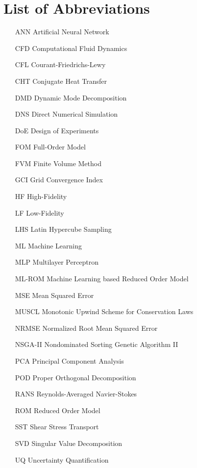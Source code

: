 \chapter*{List of Abbreviations}

\begin{itemize}
\item[ANN] Artificial Neural Network
\item[CFD] Computational Fluid Dynamics
\item[CFL] Courant-Friedrichs-Lewy
\item[CHT] Conjugate Heat Transfer
\item[DMD] Dynamic Mode Decomposition
\item[DNS] Direct Numerical Simulation
\item[DoE] Design of Experiments
\item[FOM] Full-Order Model
\item[FVM] Finite Volume Method
\item[GCI] Grid Convergence Index
\item[HF] High-Fidelity
\item[LF] Low-Fidelity
\item[LHS] Latin Hypercube Sampling
\item[ML] Machine Learning
\item[MLP] Multilayer Perceptron
\item[ML-ROM] Machine Learning based Reduced Order Model
\item[MSE] Mean Squared Error
\item[MUSCL] Monotonic Upwind Scheme for Conservation Laws
\item[NRMSE] Normalized Root Mean Squared Error
\item[NSGA-II] Nondominated Sorting Genetic Algorithm II
\item[PCA] Principal Component Analysis
\item[POD] Proper Orthogonal Decomposition
\item[RANS] Reynolds-Averaged Navier-Stokes
\item[ROM] Reduced Order Model
\item[SST] Shear Stress Transport
\item[SVD] Singular Value Decomposition
\item[UQ] Uncertainty Quantification
\end{itemize}
